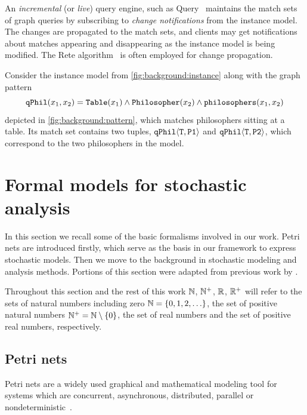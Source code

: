 An \emph{incremental} (or \emph{live}) query engine, such as  Query~\citep{Ujhelyi15incquery} maintains the match sets of graph queries by subscribing to \emph{change notifications} from the instance model. The changes are propagated to the match sets, and clients may get notifications about matches appearing and disappearing as the instance model is being modified. The Rete algorithm~\citep{Forgy82rete} is often employed for change propagation.

\begin{runningExample}
  Consider the instance model from \vref{fig:background:instance} along with the graph pattern
  \begin{equation}
    \texttt{\upshape qPhil}(x_1, x_2) = \texttt{\upshape Table}(x_1) \land \texttt{\upshape Philosopher}(x_2) \land \texttt{\upshape philosophers}(x_1, x_2) 
  \end{equation}
  depicted in \vref{fig:background:pattern}, which matches philosophers sitting at a table. Its match set contains two tuples, \(\texttt{\upshape qPhil}\langle \texttt{\upshape T}, \texttt{\upshape P1}\rangle\) and \(\texttt{\upshape qPhil}\langle \texttt{\upshape T}, \texttt{\upshape P2}\rangle\), which correspond to the two philosophers in the model.
\end{runningExample}

\section{Formal models for stochastic analysis}

In this section we recall some of the basic formalisms involved in our work. Petri nets are introduced firstly, which serve as the basis in our framework to express stochastic models. Then we move to the background in stochastic modeling and analysis methods. Portions of this section were adapted from previous work by \citet[Chapter~2]{Klenik15configurable}.

Throughout this section and the rest of this work \(\mathbb{N}\), \(\mathbb{N}^{+}\), \(\mathbb{R}\), \(\mathbb{R}^{+}\) will refer to the sets of natural numbers including zero \(\mathbb{N} = \{0, 1, 2, \ldots\}\), the set of positive natural numbers \(\mathbb{N}^{+} = \mathbb{N} \setminus \{0\}\), the set of real numbers and the set of positive real numbers, respectively.

\subsection{Petri nets}
\label{ssec:background:petri-nets}

Petri nets are a widely used graphical and mathematical modeling tool for systems which are concurrent, asynchronous, distributed, parallel or nondeterministic~\citep{Murata89petri}.

